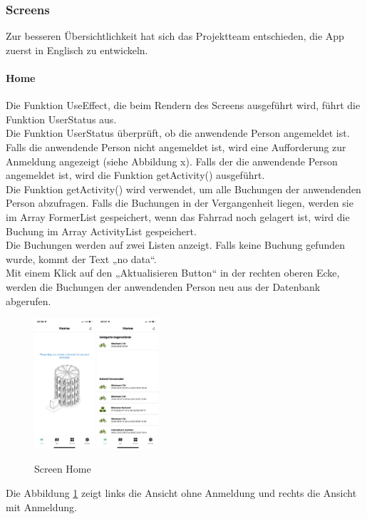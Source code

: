 \subsubsection{Screens}Zur besseren Übersichtlichkeit hat sich das Projektteam entschieden, die App zuerst in Englisch zu entwickeln.\\

\paragraph{Home}Die Funktion UseEffect, die beim Rendern des Screens ausgeführt wird, führt die Funktion UserStatus aus.\\
Die Funktion UserStatus überprüft, ob die anwendende Person angemeldet ist. Falls die anwendende Person nicht angemeldet ist, wird eine Aufforderung zur Anmeldung angezeigt (siehe Abbildung x). Falls der die anwendende Person angemeldet ist, wird die Funktion getActivity() ausgeführt. \\
Die Funktion getActivity() wird verwendet, um alle Buchungen der anwendenden Person abzufragen. Falls die Buchungen in der Vergangenheit liegen, werden sie im \Gls{Array} FormerList gespeichert, wenn das Fahrrad noch gelagert ist, wird die Buchung im \Gls{Array} ActivityList gespeichert. \\
Die Buchungen werden auf zwei Listen anzeigt. Falls keine Buchung gefunden wurde, kommt der Text „no data“. \\
Mit einem Klick auf den „Aktualisieren Button“ in der rechten oberen Ecke, werden die Buchungen der anwendenden Person neu aus der Datenbank abgerufen.\\
\begin{figure}[H]
  \centering
  \includegraphics[width=0.2\textwidth]{images/app-screenshots/screenhomeno.png}
  \includegraphics[width=0.2\textwidth]{images/app-screenshots/screenhomeyes.png}
  \caption{Screen Home}
  \label{fig:screenhome}
\end{figure}
Die Abbildung \ref{fig:screenhome} zeigt links die Ansicht ohne Anmeldung und rechts die Ansicht mit Anmeldung.


